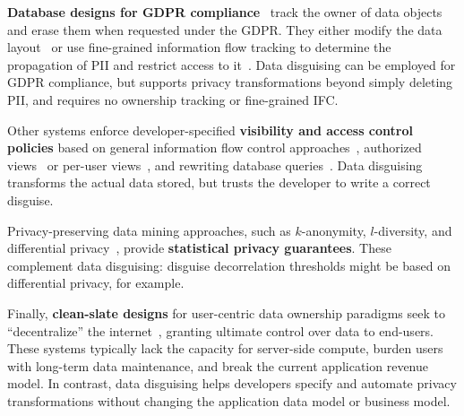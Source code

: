 \textbf{Database designs for GDPR compliance}~\cite{schengendb, usershards} track the owner of
data objects and erase them when requested under the GDPR.
%
They either modify the data layout~\cite{usershards} or use fine-grained information flow
tracking to determine the propagation of PII and restrict access to it~\cite{schengendb}.
%
Data disguising can be employed for GDPR compliance, but supports privacy transformations beyond
simply deleting PII, and requires no ownership tracking or fine-grained IFC.
%

%
Other systems enforce developer-specified \textbf{visibility and access control policies}
based on general information flow control approaches~\cite{static, jeeves, jif, hails, ifdb},
%
authorized views~\cite{oracle} or per-user views~\cite{multiverse}, and rewriting database queries~\cite{qapla, sieve}.
%
Data disguising transforms the actual data stored, but trusts the developer to write a correct disguise.
%



Privacy-preserving data mining approaches, such as $k$-anonymity, $l$-diversity, and
differential privacy~\cite{dataminingmodels, differential}, provide \textbf{statistical privacy
guarantees}.
%
These complement data disguising: disguise decorrelation thresholds might be based on
differential privacy, for example.
%


Finally, \textbf{clean-slate designs} for user-centric data ownership paradigms seek to
``decentralize'' the internet~\cite{diy, solid, amber, oort, w5, blockstack, bstore, databox},
granting ultimate control over data to end-users.
%
These systems typically lack the capacity for server-side compute, burden users with long-term
data maintenance, and break the current application revenue model.
%
In contrast, data disguising helps developers specify and automate privacy transformations
without changing the application data model or business model.
%

